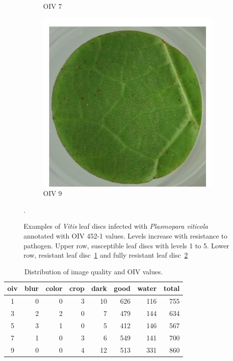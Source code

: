 \documentclass[english]{article}
\begin{document}
\begin{figure}[H]
\begin{subfigure}[b]{0.3\linewidth}
        \caption{OIV 7}\label{fig:oiv7}
    \end{subfigure}
    \begin{subfigure}[b]{0.3\linewidth}
        \includegraphics[width=\linewidth]{oiv9.png}
        \caption{OIV 9}\label{fig:oiv9}
    \end{subfigure}
    \caption{Examples of \textit{Vitis} leaf discs infected with \textit{Plasmopara viticola} annotated with OIV 452-1 values. Levels increase with resistance to pathogen. Upper row, susceptible leaf discs with levels 1 to 5. Lower row, resistant leaf disc~\ref{fig:oiv7} and fully resistant leaf disc~\ref{fig:oiv9}}\label{fig:oivlevels}.
\end{figure}

\begin{table}[H]
    \centering
    \caption{Distribution of image quality and OIV values.}
    \label{tab:dataoivcount}
    \begin{tabular}{c|rrrrrrr}
        \toprule
        oiv & blur & color & crop & dark & good & water & total \\
        \midrule
        1   & 0    & 0     & 3    & 10   & 626  & 116   & 755   \\
        3   & 2    & 2     & 0    & 7    & 479  & 144   & 634   \\
        5   & 3    & 1     & 0    & 5    & 412  & 146   & 567   \\
        7   & 1    & 0     & 3    & 6    & 549  & 141   & 700   \\
        9   & 0    & 0     & 4    & 12   & 513  & 331   & 860   \\
        \bottomrule
    \end{tabular}
\end{table}
\end{document}
